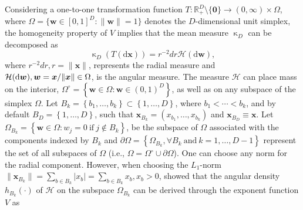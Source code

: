 \documentclass[12pt]{article}
\begin{document}
Considering a one-to-one transformation function $T:\mathbb R^D_+ \setminus \{\bm 0\}\to (0,\infty)\times \Omega$, where $\Omega = \{\bm w\in[0,1]^D: \|\bm w\| = 1\}$ denotes the $D$-dimensional unit simplex, the homogeneity property of $V$ implies that the mean measure $\upkappa_D$ can be decomposed as
%
\begin{equation}\label{eq:decomposition}
\upkappa_D(T(\text{d}\bm x)) = r^{-2}dr\mathcal H(\text{d}\bm w),
\end{equation}
%
where $r^{-2}dr, r=\|\bm x\|$, represents the radial measure and $\mathcal H(\text d\bm w), \bm w = \bm x / \|\bm x\| \in \Omega$, is the angular measure. The measure $\mathcal H$ can place mass on the interior, $\Omega^\circ = \left\{ \bm w \in \Omega: \bm w \in (0,1)^D \right\}$, as well as on any subspace of the simplex $\Omega$. Let $B_k = \left\{ b_1, \ldots, b_k\right\} \subset \left\{ 1, \ldots, D\right\}$, where $b_1 < \cdots < b_k$, and by default $B_D = \left\{ 1, \ldots, D \right\}$, such that $\bm x_{B_k} = \left( x_{b_1}, \ldots, x_{b_k}\right)$ and $\bm x_{B_D} \equiv \bm x$. Let $\Omega_{B_k} = \left\{ \bm w \in \Omega: w_j=0\ \text{if}\  j \notin B_k \right\}$, be the subspace of $\Omega$ associated with the components indexed by $B_k$ and $\partial\Omega = \left\{ \Omega_{B_k}, \forall B_k \ \text{and}\ k=1, \ldots, D-1 \right\}$ represent the set of all subspaces of $\Omega$ (i.e., $\Omega = \Omega^\circ \cup \partial\Omega$). One can choose any norm for the radial component. However, when choosing the $L_1$-norm $\|\bm x_{B_k}\|=\sum_{b \in B_k} |x_b|=\sum_{b \in B_k} x_b, x_b>0$, \citet{Coles.Tawn:1991} showed that the angular density $h_{B_k}(\cdot)$ of $\mathcal H$ on the subspace $\Omega_{B_k}$ can be derived through the exponent function $V$ as
\end{document}
